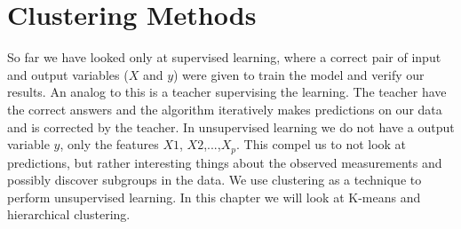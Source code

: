 \chapter{Clustering Methods} \label{ch:clusteringMethods}
So far we have looked only at supervised learning, where a correct pair of input and output variables ($X$ and $y$) were given to train the model and verify our results. An analog to this is a teacher supervising the learning. The teacher have the correct answers and the algorithm iteratively makes predictions on our data and is corrected by the teacher. In unsupervised learning we do not have a output variable $y$, only the features $X1$, $X2$,...,$X_p$. This compel us to not look at predictions, but rather interesting things about the observed measurements and possibly discover subgroups in the data. We use clustering as a technique to perform unsupervised learning. In this chapter we will look at K-means and hierarchical clustering.



